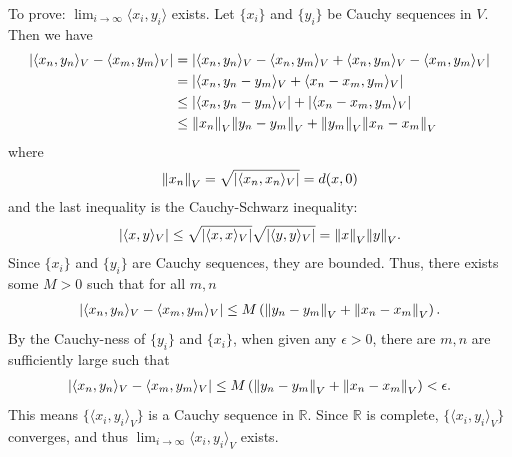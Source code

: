 \documentclass[11pt]{article}
\begin{document}
\begin{enumerate}[(a)]
\begin{itemize}
		To prove: $\lim_{i\to\infty}\langle x_i,y_i \rangle$ exists. Let $\{x_i\}$ and $\{y_i\}$ be Cauchy sequences in $V$. Then we have
		\begin{align*}
		\abs{\langle x_n,y_n\rangle_V - \langle x_m,y_m\rangle_V} &= \abs{\langle x_n,y_n \rangle_V - \langle x_n, y_m\rangle_V + \langle x_n,y_m \rangle_V - \langle x_m,y_m \rangle_V}\\
		&= \abs{\langle x_n, y_n -y_m \rangle_V  + \langle x_n-x_m, y_m \rangle_V }\\
		&\leq \abs{\langle x_n, y_n -y_m \rangle_V} + \abs{\langle x_n-x_m, y_m \rangle_V}\\
		&\leq \norm{x_n}_V\norm{y_n-y_m}_V + \norm{y_m}_V\norm{x_n - x_m}_V 
		\end{align*}
		where 
		\begin{align*}
		\norm{x_n}_V = \sqrt{\abs{\langle x_n,x_n\rangle_V}} = d(x,0)
		\end{align*}
		and the last inequality is the Cauchy-Schwarz inequality:
		\begin{align*}
		\abs{\langle x,y\rangle_V}  \leq \sqrt{\abs{\langle x,x\rangle_V}}\sqrt{\abs{\langle y,y\rangle_V}}= \norm{x}_V \norm{y}_V.
		\end{align*}
		Since $\{x_i\}$ and $\{y_i\}$ are Cauchy sequences, they are bounded. Thus, there exists some $M > 0$ such that for all $m,n$ 
		\begin{align*}
		\abs{\langle x_n,y_n\rangle_V - \langle x_m,y_m\rangle_V} \leq M\left( \norm{y_n-y_m}_V + \norm{x_n - x_m}_V \right).
		\end{align*}
		By the Cauchy-ness of $\{y_i\}$ and $\{x_i\}$, when given any $\epsilon > 0$,  there are $m,n$ are sufficiently large such that
		\begin{align*}
		\abs{\langle x_n,y_n\rangle_V - \langle x_m,y_m\rangle_V}  \leq M\left( \norm{y_n-y_m}_V + \norm{x_n - x_m}_V \right) < \epsilon.
		\end{align*}
		This means $\{ \langle x_i, y_i\rangle_V \}$ is a Cauchy sequence in $\mathbb{R}$. Since $\mathbb{R}$ is complete, $\{ \langle x_i, y_i\rangle_V \}$ converges, and thus $\lim_{i\to \infty}\langle x_i, y_i\rangle_V$ exists. 
		

\end{itemize}
\end{enumerate}
\end{document}
